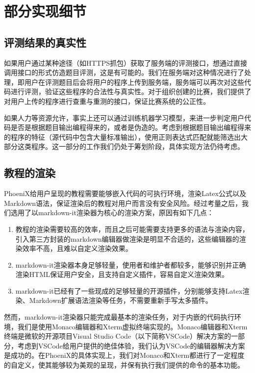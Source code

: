 \chapter{部分实现细节}

\section{评测结果的真实性}

如果用户通过某种途径（如HTTPS抓包）获取了服务端的评测接口，想通过直接调用接口的形式仿造题目评测，这是有可能的。我们在服务端对这种情况进行了处理，即用户在评测题目后会将用户的程序上传到服务端，服务端可以再次对这些代码进行评测，验证这些程序的合法性与真实性。对于组织创建的比赛，我们提供了对用户上传的程序进行查重与重测的接口，保证比赛系统的公正性。

如果人力等资源允许，事实上还可以通过训练机器学习模型，来进一步判定用户代码是否是根据题目输出编程得来的，或者是伪造的。考虑到根据题目输出编程得来的程序的特征（源代码中包含大量标准输出），使用正则表达式匹配就能筛选出大部分这类程序。这一部分的工作我们仍处于筹划阶段，具体实现方法仍待考虑。

\section{教程的渲染}

PhoeniX给用户呈现的教程需要能够嵌入代码的可执行环境，渲染Latex公式以及Markdown语法，保证渲染后的教程对用户而言没有安全风险。经过考量之后，我们选用了以markdown-it渲染器为核心的渲染方案，原因有如下几点：

\begin{enumerate}
    \item 教程的渲染需要较高的效率，而且之后可能需要支持更多的语法与渲染内容，引入第三方封装的markdown编辑器做渲染是明显不合适的，这些编辑器的渲染效率不高，且难以自定义渲染效果。
    \item markdown-it渲染器本身足够轻量，使用者和维护者都较多，能够识别并正确渲染HTML保证用户安全，且支持自定义插件，容易自定义渲染效果。
    \item markdown-it已经有了一些现成的足够轻量的开源插件，分别能够支持Latex渲染、Markdown扩展语法渲染等任务，不需要重新手写太多插件。
\end{enumerate}

然而，markdown-it渲染器只能完成最基本的渲染任务，对于内嵌的代码执行环境，我们是使用Monaco编辑器和Xterm虚拟终端实现的。Monaco编辑器和Xterm终端是微软的开源项目Visual Studio Code（以下简称VSCode）解决方案的一部分，考虑到VSCode给用户提供的绝佳体验，我们认为VSCode的编辑器解决方案是成功的。在PhoeniX的具体实现上，我们对Monaco和Xterm都进行了一定程度的自定义，使其能够较为美观的呈现，并保有执行我们提供的命令的基本功能。

